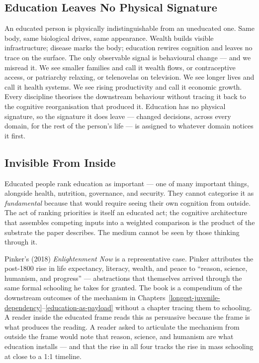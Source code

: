 \documentclass[12pt,letterpaper]{article}
\begin{document}
\subsection{Education Leaves No Physical Signature}\label{education-leaves-no-physical-signature}

An educated person is physically indistinguishable from an uneducated
one. Same body, same biological drives, same appearance. Wealth builds
visible infrastructure; disease marks the body; education rewires
cognition and leaves no trace on the surface. The only observable signal
is behavioural change --- and we misread it. We see smaller families and
call it wealth flows, or contraceptive access, or patriarchy relaxing, or
telenovelas on television. We see longer lives and call it health systems.
We see rising productivity and call it economic growth. Every discipline
theorises the downstream behaviour without tracing it back to the
cognitive reorganisation that produced it. Education has no physical
signature, so the signature it does leave --- changed decisions, across
every domain, for the rest of the person's life --- is assigned to
whatever domain notices it first.

\subsection{Invisible From Inside}\label{invisible-from-inside}

Educated people rank education as important --- one of many important
things, alongside health, nutrition, governance, and security. They
cannot categorise it as \emph{fundamental} because that would require
seeing their own cognition from outside. The act of ranking priorities
is itself an educated act; the cognitive architecture that assembles
competing inputs into a weighted comparison is the product of the
substrate the paper describes. The medium cannot be seen by those
thinking through it.

Pinker's (2018) \emph{Enlightenment Now} is a representative case.
Pinker attributes the post-1800 rise in life expectancy, literacy,
wealth, and peace to ``reason, science, humanism, and progress''
--- abstractions that themselves arrived through the same formal
schooling he takes for granted. The book is a compendium of the
downstream outcomes of the mechanism in Chapters~\ref{longest-juvenile-dependency}--\ref{education-as-payload}
without a chapter tracing them to schooling. A reader inside the
educated frame reads this as persuasive because the frame is what
produces the reading. A reader asked to articulate the mechanism
from outside the frame would note that reason, science, and humanism
are what education installs --- and that the rise in all four tracks
the rise in mass schooling at close to a 1:1 timeline.
\end{document}
